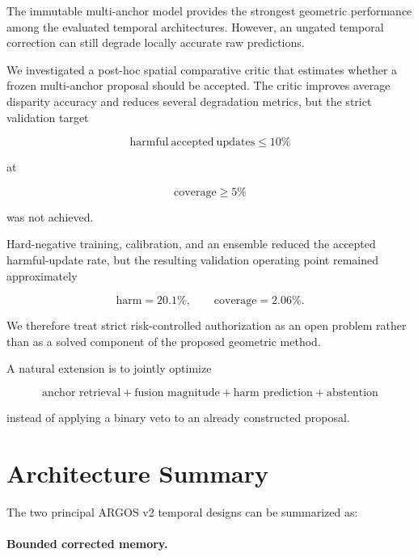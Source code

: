 \documentclass[11pt,a4paper]{article}
\begin{document}
The immutable multi-anchor model provides the strongest geometric
performance among the evaluated temporal architectures.
However, an ungated temporal correction can still degrade locally
accurate raw predictions.

We investigated a post-hoc spatial comparative critic that estimates
whether a frozen multi-anchor proposal should be accepted.
The critic improves average disparity accuracy and reduces several
degradation metrics, but the strict validation target

\begin{equation}
\mathrm{harmful\ accepted\ updates}
\leq 10\%
\end{equation}

at

\begin{equation}
\mathrm{coverage}
\geq 5\%
\end{equation}

was not achieved.

Hard-negative training, calibration, and an ensemble reduced the
accepted harmful-update rate, but the resulting validation operating
point remained approximately

\begin{equation}
\mathrm{harm}=20.1\%,
\qquad
\mathrm{coverage}=2.06\%.
\end{equation}

We therefore treat strict risk-controlled authorization as an open
problem rather than as a solved component of the proposed geometric
method.

A natural extension is to jointly optimize

\begin{equation}
\boxed{
\text{anchor retrieval}
+
\text{fusion magnitude}
+
\text{harm prediction}
+
\text{abstention}
}
\end{equation}

instead of applying a binary veto to an already constructed proposal.

\section{Architecture Summary}
\label{sec:architecture_summary}

The two principal ARGOS v2 temporal designs can be summarized as:

\paragraph{Bounded corrected memory.}
\end{document}
